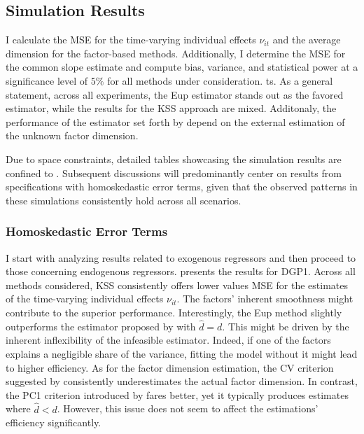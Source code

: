 \subsection{Simulation Results}

I calculate the \ac{MSE} for the time-varying individual effects $\nu_{it}$ and the average dimension for the factor-based methods. Additionally, I determine the \ac{MSE} for the common slope estimate and compute bias, variance, and statistical power at a significance level of $5\%$ for all methods under consideration. ts. As a general statement, across all experiments,  the \ac{Eup} estimator stands out as the favored estimator, while the results for the \ac{KSS} approach are mixed. Additonaly, the performance of the estimator set forth by \citet{bai2009panel} depend on the external estimation of the unknown factor dimension.

Due to space constraints, detailed tables showcasing the simulation results are confined to . Subsequent discussions will predominantly center on results from specifications with homoskedastic error terms, given that the observed patterns in these simulations consistently hold across all scenarios.


\subsubsection{Homoskedastic Error Terms}\label{homodiscuss}
I start with analyzing results related to exogenous regressors and then proceed to those concerning endogenous regressors.  presents the results for \ac{DGP}1. Across all methods considered, \ac{KSS} consistently offers lower values \ac{MSE} for the estimates of the time-varying individual effects $\nu_{it}$. The factors' inherent smoothness might contribute to the superior performance.
 Interestingly, the \ac{Eup} method slightly outperforms the estimator proposed by \citet{bai2009panel} with $\hat{d} = d$. This might be driven by the inherent inflexibility of the infeasible estimator. Indeed, if one of the factors explains a negligible share of the variance, fitting the model without it might lead to higher efficiency.  As for the factor dimension estimation, the \ac{CV} criterion suggested by \citet{kneip2012new} consistently underestimates the actual factor dimension. In contrast, the PC1 criterion introduced by \citet{bai2002determining} fares better, yet it typically produces estimates where $\hat{d} < d$. However, this issue does not seem to affect the estimations' efficiency significantly.   

